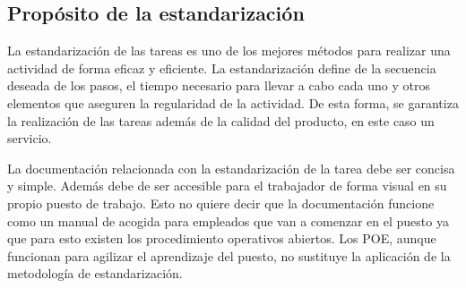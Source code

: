 \subsection{Propósito de la estandarización}

La estandarización de las tareas es uno de los mejores métodos para realizar una actividad de forma eficaz y eficiente. La estandarización define de la secuencia deseada de los pasos, el tiempo necesario para llevar a cabo cada uno y otros elementos que aseguren la regularidad de la actividad. De esta forma, se garantiza la realización de las tareas además de la calidad del producto, en este caso un servicio.

La documentación relacionada con la estandarización de la tarea debe ser concisa y simple.
Además debe de ser accesible para el trabajador de forma visual en su propio puesto de trabajo.
Esto no quiere decir que la documentación funcione como un manual de acogida para empleados que van a comenzar en el puesto ya que para esto existen los procedimiento operativos abiertos. Los POE, aunque funcionan para agilizar el aprendizaje del puesto, no sustituye la aplicación de la metodología de estandarización.





